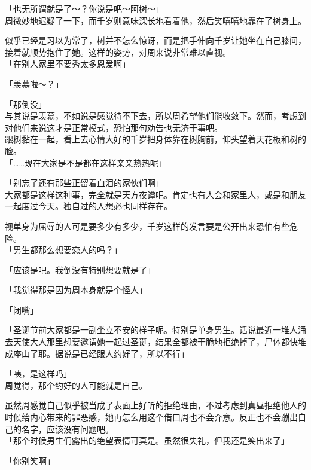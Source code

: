 「也无所谓就是了～？你说是吧～阿树～」\\

周微妙地迟疑了一下，而千岁则意味深长地看着他，然后笑嘻嘻地靠在了树身上。

似乎已经是习以为常了，树并不怎么惊讶，而是把手伸向千岁让她坐在自己膝间，接着就顺势抱住了她。这样的姿势，对周来说非常难以直视。\\

「在别人家里不要秀太多恩爱啊」

「羡慕啦～？」

「那倒没」\\

与其说是羡慕，不如说是感觉待不下去，所以周希望他们能收敛下。然而，考虑到对他们来说这才是正常模式，恐怕那句劝告也无济于事吧。\\

跟树黏在一起，看上去心情大好的千岁把身体靠在树胸前，仰头望着天花板和树的脸。\\

「……现在大家是不是都在这样亲亲热热呢」

「别忘了还有那些正留着血泪的家伙们啊」\\

大家都是这样这种事，完全就是天方夜谭吧。肯定也有人会和家里人，或是和朋友一起度过今天。独自过的人想必也同样存在。

视单身为屈辱的人可是要多少有多少，千岁这样的发言要是公开出来恐怕有些危险。\\

「男生都那么想要恋人的吗？」

「应该是吧。我倒没有特别想要就是了」

「我觉得那是因为周本身就是个怪人」

「闭嘴」

「圣诞节前大家都是一副坐立不安的样子呢。特别是单身男生。话说最近一堆人涌去天使大人那里想要邀请她一起过圣诞，结果全都被干脆地拒绝掉了，尸体都快堆成座山了耶。据说是已经跟人约好了，所以不行」

「咦，是这样吗」\\

周觉得，那个约好的人可能就是自己。

虽然周感觉自己似乎被当成了表面上好听的拒绝理由，不过考虑到真昼拒绝他人的时候给内心带来的罪恶感，她再怎么用这个借口周也不会介意。反正也不会蹦出自己的名字，应该没有问题吧。\\

「那个时候男生们露出的绝望表情可真是。虽然很失礼，但我还是笑出来了」

「你别笑啊」

